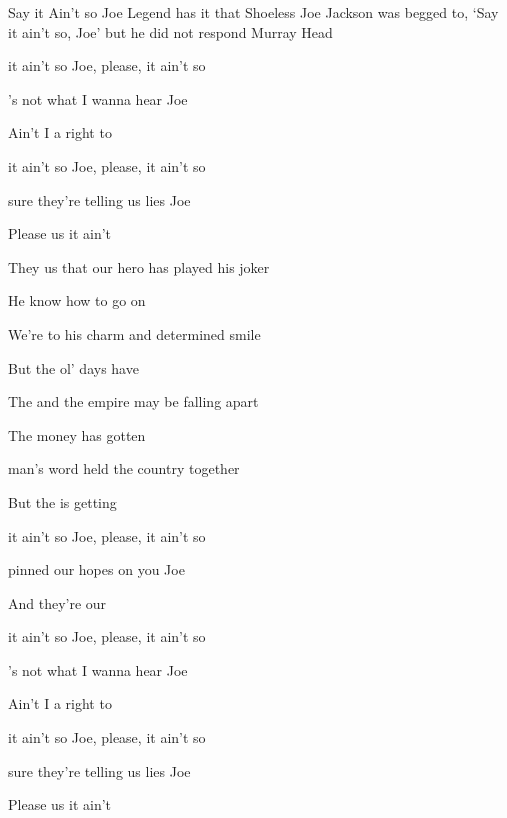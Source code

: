 \begin{SBSong}{Say it Ain't so Joe}
  {Legend has it that Shoeless Joe Jackson was begged to, `Say it ain't so, Joe' but he did not respond}
  {Murray Head}
  \begin{SBVerse}
     it ain't so Joe, please,  it ain't so

    's not what I wanna hear Joe

    Ain't I  a right to 

     it ain't so Joe, please,  it ain't so

     sure they're telling us lies Joe

    Please  us it ain't 
  \end{SBVerse}
  \begin{SBVerse}
    They  us that our hero has played his joker

    He  know how to go on

    We're  to his charm and determined smile

    But the  ol' days have 

    The  and the empire may be falling apart

    The money has gotten 

     man's word held the country together

    But the  is getting 

     it ain't so Joe, please,  it ain't so

     pinned our hopes on you Joe

    And they're  our 
  \end{SBVerse}
  \begin{SBVerse}
     it ain't so Joe, please,  it ain't so

    's not what I wanna hear Joe

    Ain't I  a right to 

     it ain't so Joe, please,  it ain't so

     sure they're telling us lies Joe

    Please  us it ain't 
  \end{SBVerse}
\end{SBSong}